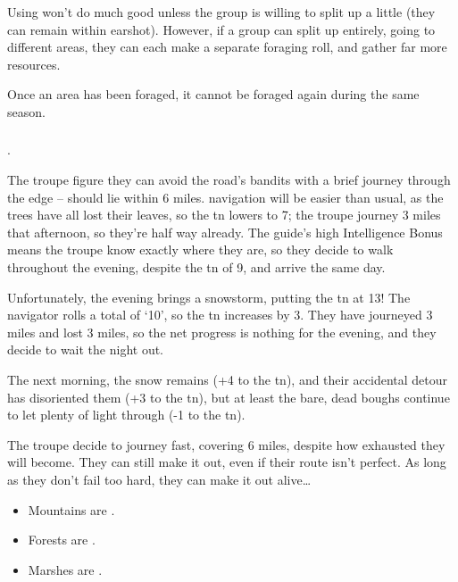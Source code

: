 \begin{multicols}{2}
Using  won't do much good unless the group is willing to split up a little (they can remain within earshot).
However, if a group can split up entirely, going to different areas, they can each make a separate foraging roll, and gather far more resources.

Once an area has been foraged, it cannot be foraged again during the same season.

\subsubsection{}
\label{navigate_land}
.

\begin{exampletext}
  The troupe figure they can avoid the road's bandits with a brief journey through the \gls{edge} --  should lie within 6 miles.
  \Gls{navigation} will be easier than usual, as the trees have all lost their leaves, so the \gls{tn} lowers to 7; the troupe journey 3 miles that afternoon, so they're half way already.
  The guide's high Intelligence Bonus means the troupe know exactly where they are, so they decide to walk throughout the evening, despite the \gls{tn} of 9, and arrive the same day.

  Unfortunately, the evening brings a snowstorm, putting the \gls{tn} at 13!
  The navigator rolls a total of `10', so the \gls{tn} increases by 3.
  They have journeyed 3 miles and lost 3 miles, so the net progress is nothing for the evening, and they decide to wait the night out.

  The next morning, the snow remains (+4 to the \gls{tn}), and their accidental detour has disoriented them (+3 to the \gls{tn}), but at least the bare, dead boughs continue to let plenty of light through (-1 to the \gls{tn}).

  The troupe decide to journey fast, covering 6 miles, despite how exhausted they will become.
  They can still make it out, even if their route isn't perfect.
  As long as they don't fail too hard, they can make it out alive\ldots
\end{exampletext}

\begin{multicols}{2}
\begin{itemize}
  \item
    Mountains are \tn[8].
  \item
    Forests are \tn[11].
  \item
    Marshes are \tn[12].
\end{itemize}


\end{multicols}
\end{multicols}

